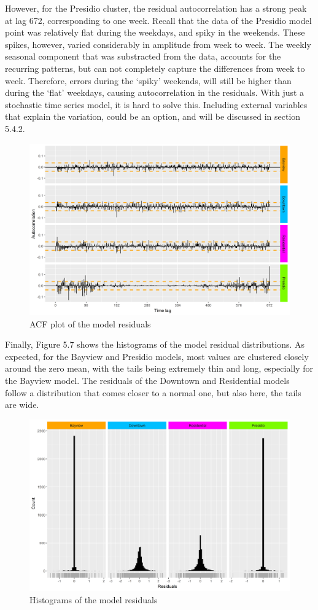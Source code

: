 \documentclass[12pt,oneside]{reedthesis}
\begin{document}
However, for the Presidio cluster, the residual autocorrelation has a
strong peak at lag 672, corresponding to one week. Recall that the data
of the Presidio model point was relatively flat during the weekdays, and
spiky in the weekends. These spikes, however, varied considerably in
amplitude from week to week. The weekly seasonal component that was
substracted from the data, accounts for the recurring patterns, but can
not completely capture the differences from week to week. Therefore,
errors during the `spiky' weekends, will still be higher than during the
`flat' weekdays, causing autocorrelation in the residuals. With just a
stochastic time series model, it is hard to solve this. Including
external variables that explain the variation, could be an option, and
will be discussed in section 5.4.2.
\begin{figure}[H]
\includegraphics[width=\textwidth]{Figures/residual_acfplots} \caption{ACF plot of the model residuals}\label{fig:residualacf}
\end{figure}
Finally, Figure 5.7 shows the histograms of the model residual
distributions. As expected, for the Bayview and Presidio models, most
values are clustered closely around the zero mean, with the tails being
extremely thin and long, especially for the Bayview model. The residuals
of the Downtown and Residential models follow a distribution that comes
closer to a normal one, but also here, the tails are wide.
\begin{figure}[H]
\includegraphics[width=\textwidth]{Figures/residual_histograms} \caption{Histograms of the model residuals}\label{fig:residualhist}
\end{figure}
\end{document}
